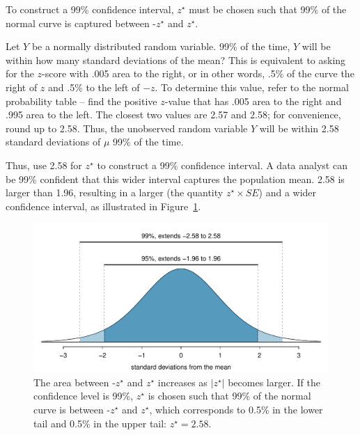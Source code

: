 \begin{spacing}{1.5}
To construct a 99\% confidence interval, $z^{\star}$ must be chosen such that 99\% of the normal curve is captured between -$z^{\star}$ and $z^{\star}$.

\begin{example}{Let $Y$ be a normally distributed random variable. 99\% of the time, $Y$ will be within how many standard deviations of the mean?}
	This is equivalent to asking for the $z$-score with .005 area to the right, or in other words, .5\% of the curve the right of $z$ and .5\% to the left of $-z$. To determine this value, refer to the normal probability table -- find the positive $z$-value that has .005 area to the right and .995 area to the left. The closest two values are 2.57 and 2.58; for convenience, round up to 2.58. Thus, the unobserved random variable $Y$ will be within 2.58 standard deviations of $\mu$ 99\% of the time.
\end{example}

Thus, use 2.58 for $z^{\star}$ to construct a 99\% confidence interval. A data analyst can be 99\% confident that this wider interval captures the population mean. 2.58 is larger than 1.96, resulting in a larger  (the quantity $z^{\star} \times SE$) and a wider confidence interval, as illustrated in Figure~\ref{choosingZForCI}.

\begin{figure}[h]
	\centering
	\includegraphics[width=\textwidth]
	{ch_inference_foundations_oi_biostat/figures/choosingZForCI/choosingZForCI}
	\caption{The area between -$z^{\star}$ and $z^{\star}$ increases as $|z^{\star}|$ becomes larger. If the confidence level is 99\%, $z^{\star}$ is chosen such that 99\% of the normal curve is between -$z^{\star}$ and $z^{\star}$, which corresponds to 0.5\% in the lower tail and 0.5\% in the upper tail: $z^{\star}=2.58$.}
	\label{choosingZForCI}
\end{figure}
 

\end{spacing}
